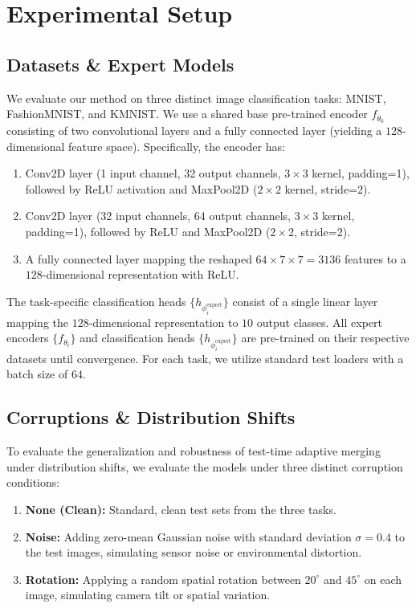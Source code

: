 \documentclass{article}
\begin{document}
\section{Experimental Setup}
\label{sec:experiments}

\subsection{Datasets \& Expert Models}
We evaluate our method on three distinct image classification tasks: MNIST, FashionMNIST, and KMNIST. We use a shared base pre-trained encoder $f_{\theta_0}$ consisting of two convolutional layers and a fully connected layer (yielding a $128$-dimensional feature space). Specifically, the encoder has:
\begin{enumerate}
    \item Conv2D layer (1 input channel, 32 output channels, $3\times3$ kernel, padding=1), followed by ReLU activation and MaxPool2D ($2\times2$ kernel, stride=2).
    \item Conv2D layer (32 input channels, 64 output channels, $3\times3$ kernel, padding=1), followed by ReLU and MaxPool2D ($2\times2$, stride=2).
    \item A fully connected layer mapping the reshaped $64 \times 7 \times 7 = 3136$ features to a $128$-dimensional representation with ReLU.
\end{enumerate}
The task-specific classification heads $\{h_{\phi_i^{\text{expert}}}\}$ consist of a single linear layer mapping the $128$-dimensional representation to $10$ output classes. All expert encoders $\{f_{\theta_i}\}$ and classification heads $\{h_{\phi_i^{\text{expert}}}\}$ are pre-trained on their respective datasets until convergence. For each task, we utilize standard test loaders with a batch size of $64$.

\subsection{Corruptions \& Distribution Shifts}
To evaluate the generalization and robustness of test-time adaptive merging under distribution shifts, we evaluate the models under three distinct corruption conditions:
\begin{enumerate}
    \item \textbf{None (Clean):} Standard, clean test sets from the three tasks.
    \item \textbf{Noise:} Adding zero-mean Gaussian noise with standard deviation $\sigma = 0.4$ to the test images, simulating sensor noise or environmental distortion.
    \item \textbf{Rotation:} Applying a random spatial rotation between $20^{\circ}$ and $45^{\circ}$ on each image, simulating camera tilt or spatial variation.
\end{enumerate}
\end{document}
